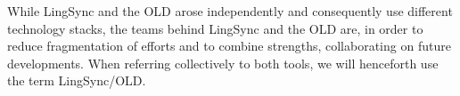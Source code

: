 \documentclass[11pt]{article}
\begin{document}
While LingSync and the OLD arose independently and consequently use different
technology stacks, the teams behind LingSync and the OLD are, in order to
reduce fragmentation of efforts and to combine strengths, collaborating on
future developments. When referring collectively to both tools, we will
henceforth use the term LingSync/OLD.

%
%
%
%
\end{document}
